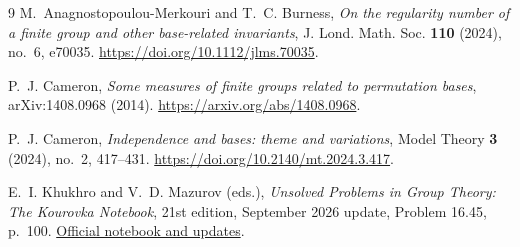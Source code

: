 \IfFileExists{baustms.cls}{\bulletinformattrue\documentclass[plain]{baustms}}{\bulletinformatfalse\documentclass[11pt]{amsart}}
\theoremstyle{cupthm}
\begin{document}
\begin{thebibliography}{9}
M.~Anagnostopoulou-Merkouri and T.~C. Burness,
\emph{On the regularity number of a finite group and other base-related
invariants}, J. Lond. Math. Soc. \textbf{110} (2024), no.~6, e70035.
\url{https://doi.org/10.1112/jlms.70035}.

P.~J. Cameron, \emph{Some measures of finite groups related to permutation
bases}, arXiv:1408.0968 (2014).
\url{https://arxiv.org/abs/1408.0968}.

P.~J. Cameron, \emph{Independence and bases: theme and variations},
Model Theory \textbf{3} (2024), no.~2, 417--431.
\url{https://doi.org/10.2140/mt.2024.3.417}.

E.~I. Khukhro and V.~D. Mazurov (eds.),
\emph{Unsolved Problems in Group Theory: The Kourovka Notebook},
21st edition, September 2026 update, Problem 16.45, p.~100.
\href{https://kourovkanotebookorg.wordpress.com/wp-content/uploads/2026/09/21tkt.pdf}{Official notebook and updates}.
\end{thebibliography}
\end{document}
